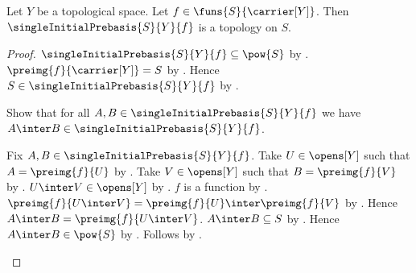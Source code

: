 \begin{theorem}\label{single_initial_prebasis_is_topology}
    Let $Y$ be a topological space.
    Let $f\in\funs{S}{\carrier[Y]}$.
    Then $\singleInitialPrebasis{S}{Y}{f}$ is a topology on $S$.
\end{theorem}
\begin{proof}
    $\singleInitialPrebasis{S}{Y}{f}\subseteq\pow{S}$ by
        .
    $\preimg{f}{\carrier[Y]}=S$ by
        .
    Hence $S\in\singleInitialPrebasis{S}{Y}{f}$ by
        .

    Show that for all $A,B\in\singleInitialPrebasis{S}{Y}{f}$ we have
        $A\inter B\in\singleInitialPrebasis{S}{Y}{f}$.
    \begin{subproof}
        Fix $A,B\in\singleInitialPrebasis{S}{Y}{f}$.
        Take $U\in\opens[Y]$ such that $A=\preimg{f}{U}$ by
            .
        Take $V\in\opens[Y]$ such that $B=\preimg{f}{V}$ by
            .
        $U\inter V\in\opens[Y]$ by .
        $f$ is a function by .
        $\preimg{f}{U\inter V}
            =\preimg{f}{U}\inter\preimg{f}{V}$ by
            .
        Hence $A\inter B=\preimg{f}{U\inter V}$.
        $A\inter B\subseteq S$ by
            .
        Hence $A\inter B\in\pow{S}$ by .
        Follows by
            .
    \end{subproof}


\end{proof}
